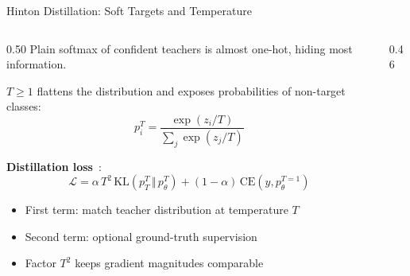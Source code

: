 \begin{frame}{Hinton Distillation: Soft Targets and Temperature}
  \begin{columns}[T]
    \begin{column}{0.50\textwidth}
      Plain softmax of confident teachers is almost one-hot, hiding most information.

      \vspace{0.3em}
       $T \geq 1$ flattens the distribution and exposes  probabilities of non-target classes:
      \[
        p_i^T = \frac{\exp(z_i / T)}{\sum_j \exp(z_j / T)}
      \]

      \vspace{0.3em}
      \textbf{Distillation loss}~\cite{hinton2015distillation}:
      \[
        \mathcal{L} = \alpha \, T^2 \, \mathrm{KL}\!\left(p_T^T \,\Vert\, p_\theta^T\right) + (1 - \alpha)\, \mathrm{CE}(y, p_\theta^{T=1})
      \]

      \vspace{0.2em}
      \begin{itemize}[nosep]
        \item First term: match teacher distribution at temperature $T$
        \item Second term: optional ground-truth supervision
        \item Factor $T^2$ keeps gradient magnitudes comparable
      \end{itemize}
    \end{column}
    \begin{column}{0.46\textwidth}
      \centering


\end{column}
\end{columns}
\end{frame}
